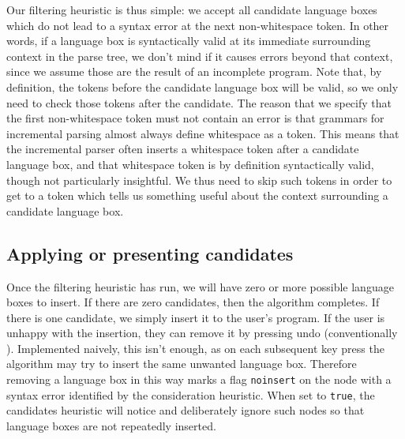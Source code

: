 \documentclass[sigplan,screen]{acmart}\settopmatter{printfolios=true,printccs=false,printacmref=false}
\begin{document}
Our filtering heuristic is thus simple: we accept all candidate language
boxes which do not lead to a syntax error at the next non-whitespace token. In other
words, if a language box is syntactically valid at its immediate surrounding
context in the parse tree, we don't mind if it causes errors beyond that
context, since we assume those are the result of an
incomplete program. Note that, by definition, the tokens before the candidate
language box will be valid, so we only need to check those tokens after the
candidate. The reason that we specify that the first non-whitespace
token must not contain an error is that grammars for incremental parsing almost
always define whitespace as a token. This means that the incremental parser
often inserts a whitespace token after a candidate language box, and that
whitespace token is by definition syntactically valid, though not particularly
insightful. We thus need to skip such tokens in order to get to a
token which tells us something useful about the context surrounding a candidate
language box.


\subsection{Applying or presenting candidates}
\label{applying and presenting}

Once the filtering heuristic has run, we will have zero or more possible
language boxes to insert. If there are zero candidates, then the algorithm
completes. If there is one candidate, we simply insert it to the user's
program. If the user is unhappy with the insertion, they can remove it by
pressing undo (conventionally ). Implemented naively, this isn't
enough, as on each subsequent key press the algorithm may try to insert the
same unwanted language box. Therefore removing a language box in this way marks
a flag \texttt{noinsert} on the node with a syntax error identified by the
consideration heuristic. When set to \texttt{true}, the candidates heuristic
will notice and deliberately ignore such nodes so that language boxes are not
repeatedly inserted.
\end{document}
